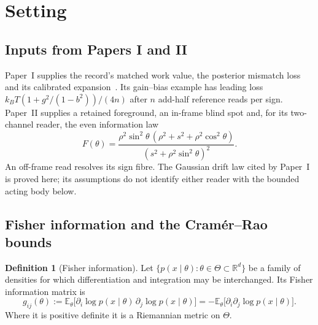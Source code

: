 \documentclass[12pt]{article}
\theoremstyle{definition}
\newtheorem{definition}[theorem]{Definition}
\newcommand{\E}{\mathbb E}
\begin{document}
\section{Setting}
\label{sec:prelim}

\subsection{Inputs from Papers I and II}
\label{subsec:from_I}\label{subsec:from_II}
Paper~I supplies the record's matched work value, the posterior mismatch
loss and its calibrated expansion~\cite{Liu2026TDOME_I}.
Its gain--bias example has leading loss
$k_BT(1+g^2/(1-b^2))/(4n)$ after $n$ add-half reference reads per sign.
Paper~II supplies a retained foreground, an in-frame blind spot and,
for its two-channel reader, the even information law~\cite{Liu2026TDOME_II}
\begin{equation}\label{eq:fisher_even_II}
 F(\theta)=\frac{\rho^2\sin^2\theta\,(\rho^2+s^2+\rho^2\cos^2\theta)}
 {(s^2+\rho^2\sin^2\theta)^2}.
\end{equation}
An off-frame read resolves its sign fibre. The Gaussian drift law cited
by Paper~I is proved here; its assumptions do not identify either reader
with the bounded acting body below.

\subsection{Fisher information and the Cram\'er--Rao bounds}
\label{subsec:fisher}

\begin{definition}[Fisher information]
\label{def:fisher}
Let $\{p(x\mid\theta):\theta\in\Theta\subset\mathbb R^d\}$ be a family of densities for which differentiation and integration may be interchanged. Its Fisher information matrix is
\begin{equation}
\label{eq:fisher_def}
g_{ij}(\theta)
:=\E_\theta\bigl[\partial_i\log p(x\mid\theta)\,\partial_j\log p(x\mid\theta)\bigr]
=-\E_\theta\bigl[\partial_i\partial_j\log p(x\mid\theta)\bigr].
\end{equation}
Where it is positive definite it is a Riemannian metric on $\Theta$.
\end{definition}
\end{document}
